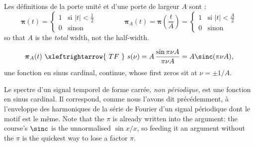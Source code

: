 \begin{definition}
  Les définitions de la porte unité et d'une porte de largeur $A$ sont :
  \[
    \boldsymbol{\pi}(t)=\begin{cases}1 & \text{si } |t|<\tfrac12\\ 0 & \text{sinon}\end{cases}
    \qquad\qquad
    \boldsymbol{\pi}_A(t)=\boldsymbol{\pi}\!\left(\frac{t}{A}\right)
      =\begin{cases}1 & \text{si } |t|<\tfrac{A}{2}\\ 0 & \text{sinon}\end{cases}
  \]
  so that $A$ is the \emph{total} width, not the half-width.
\end{definition}

\begin{prop}
  \[
    \boldsymbol{\pi}_A(t)\ \xleftrightarrow{\ TF\ }\
    s(\nu)=A\,\frac{\sin\pi\nu A}{\pi\nu A}=A\sinc(\pi\nu A),
  \]
  une fonction en sinus cardinal, continue, whose first zeros sit at
  $\nu=\pm 1/A$.
\end{prop}

Le spectre d'un signal temporel de forme carrée, \emph{non périodique}, est une
fonction en sinus cardinal. Il correspond, comme nous l'avons dit précédemment, à
l'enveloppe des harmoniques de la série de Fourier d'un signal périodique dont le
motif est le même. Note that the $\pi$ is already written into the argument:
the course's $\sinc$ is the unnormalised $\sin x/x$, so feeding it an argument
without the $\pi$ is the quickest way to lose a factor $\pi$.

